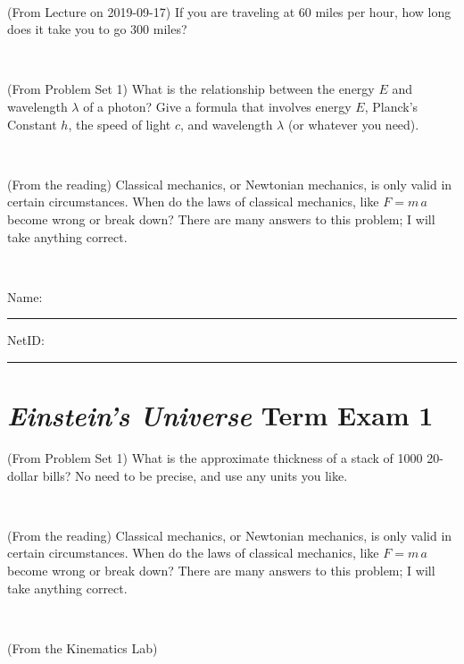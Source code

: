 \documentclass[12pt, letterpaper]{article}
\begin{document}
\vfill ~

\begin{problem} (From Lecture on 2019-09-17)
If you are traveling at 60 miles per hour, how long does
it take you to go 300 miles?
\end{problem}


\vfill ~

\begin{problem} (From Problem Set 1)
What is the relationship between the energy $E$ and wavelength
$\lambda$ of a photon? Give a formula that involves energy $E$,
Planck's Constant $h$, the speed of light $c$, and wavelength
$\lambda$ (or whatever you need).
\end{problem}

\vfill ~

\begin{problem} (From the reading)
Classical mechanics, or Newtonian mechanics, is only valid in certain
circumstances. When do the laws of classical mechanics, like $F =
m\,a$ become wrong or break down? There are many answers to this
problem; I will take anything correct.
\end{problem}


\vfill ~


\cleardoublepage



\noindent
Name: \rule[-1ex]{0.60\textwidth}{0.1pt}
NetID: \rule[-1ex]{0.20\textwidth}{0.1pt}

\section*{\textsl{Einstein's Universe} Term Exam 1}
\setcounter{problem}{1}


\begin{problem} (From Problem Set 1)
What is the approximate thickness of a stack of 1000 20-dollar bills?
No need to be precise, and use any units you like.
\end{problem}


\vfill ~

\begin{problem} (From the reading)
Classical mechanics, or Newtonian mechanics, is only valid in certain
circumstances. When do the laws of classical mechanics, like $F =
m\,a$ become wrong or break down? There are many answers to this
problem; I will take anything correct.
\end{problem}


\vfill ~

\begin{problem} (From the Kinematics Lab)

\end{problem}
\end{document}

